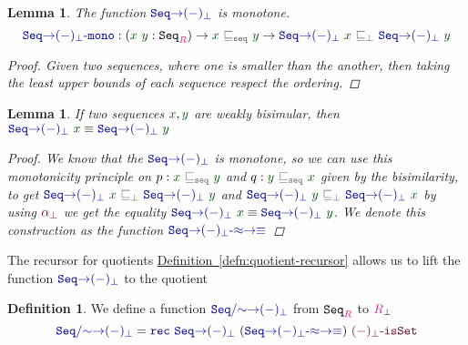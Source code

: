 \documentclass[twoside,11pt,openright]{report}
\theoremstyle{plain} %
\newtheorem{lem}[thm]{Lemma}
\theoremstyle{definition}
\newtheorem{defn}[thm]{Definition}%
\theoremstyle{remark}
\newcommand*{\defref}[1]{\hyperref[defn:#1]{Definition~\ref*{defn:#1}}}
\newcommand*{\term}[1]{\textcolor{green!30!black}{#1}} %
\newcommand*{\type}[1]{\textcolor{magenta!90!black}{#1}}
\newcommand*{\relation}[1]{\textcolor{gray!75!black}{\ensuremath{\mathtt{#1}}}}
\newcommand*{\function}[1]{\textcolor{blue!60!black}{\ensuremath{\mathtt{#1}}}}
\newcommand*{\constructor}[1]{\textcolor{purple!60!black}{\ensuremath{\mathtt{#1}}}}
\newcommand*{\typeformer}[1]{\ensuremath{\mathtt{#1}}}
\begin{document}
\begin{lem}
  The function \(\function{Seq{\rightarrow}(-)_\bot}\) is monotone. 
  \begin{equation}
    \function{Seq{\rightarrow}(-)_\bot\text{-}mono} : (\term{x}~\term{y} : \typeformer{Seq}_{\type{R}}) \rightarrow \term{x}~\relation{\sqsubseteq_{seq}}~\term{y} \rightarrow \function{Seq{\rightarrow}(-)_\bot}~\term{x}~\relation{\sqsubseteq_{\bot}}~\function{Seq{\rightarrow}(-)_\bot}~\term{y}
\end{equation}
  \begin{proof}
    Given two sequences, where one is smaller than the another, then taking the least upper bounds of each sequence respect the ordering.  
  \end{proof}
\end{lem}
\begin{lem}
  If two sequences \(\term{x},\term{y}\) are weakly bisimular, then \(\function{Seq{\rightarrow}(-)_\bot}~\term{x} \equiv \function{Seq{\rightarrow}(-)_\bot}~\term{y}\)
  \begin{proof} We know that the \(\function{Seq{\rightarrow}(-)_{\bot}}\) is monotone, so we can use this monotonicity principle on \(p : \term{x}~\relation{\sqsubseteq_{seq}}~\term{y}\) and \(q : \term{y}~\relation{\sqsubseteq_{seq}}~\term{x}\) given by the bisimilarity, to get \(\function{Seq{\rightarrow}(-)_\bot}~\term{x}~\relation{\sqsubseteq_{\bot}}~\function{Seq{\rightarrow}(-)_\bot}~\term{y}\) and \(\function{Seq{\rightarrow}(-)_\bot}~\term{y}~\relation{\sqsubseteq_{\bot}}~\function{Seq{\rightarrow}(-)_\bot}~\term{x}\) by using \(\constructor{\alpha_{\bot}}\) we get the equality \(\function{Seq{\rightarrow}(-)_\bot}~\term{x} \equiv \function{Seq{\rightarrow}(-)_\bot}~\term{y}\). We denote this construction as the function \(\function{Seq{\rightarrow}(-)_\bot\text{-}{\approx}{\rightarrow}{\equiv}}\)
  \end{proof}
\end{lem}
\noindent The recursor for quotients \defref{quotient-recursor} allows us to lift the function \(\function{Seq{\rightarrow}(-)_\bot}\) to the quotient
\begin{defn}
  \label{eq:QuotientedSeqToPartialityMonad}
  We define a function \(\function{Seq/{\sim}{\rightarrow}(-)_\bot}\) from \(\typeformer{Seq}_{\type{R}}\) to \(\type{R}_{\bot}\)
  \begin{equation}
    \function{Seq/{\sim}{\rightarrow}(-)_\bot} = \function{rec}~\function{Seq{\rightarrow}(-)_\bot}~(\function{Seq{\rightarrow}(-)_\bot\text{-}{\approx}{\rightarrow}{\equiv}})~\constructor{(-)_\bot\text{-}isSet}
  \end{equation} 
\end{defn}
\end{document}
